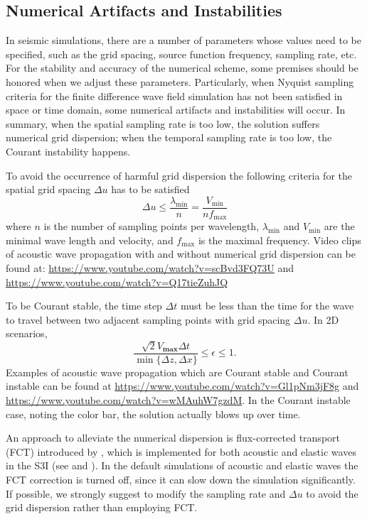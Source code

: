 \documentclass[11pt,titlepage]{article}
\theoremstyle{plain}
\theoremstyle{definition}
\theoremstyle{remark}
\numberwithin{equation}{section}
\begin{document}
\subsection{Numerical Artifacts and Instabilities}
In seismic simulations, there are a number of parameters whose values need to be specified, such as the grid spacing, source function frequency, sampling rate, etc. For the stability and accuracy of the numerical scheme, some premises should be honored when we adjust these parameters. Particularly, when Nyquist sampling criteria for the finite difference wave field simulation has not been satisfied in space or time domain, some numerical artifacts and instabilities will occur. In summary, when the spatial sampling rate is too low,  the solution suffers numerical grid dispersion; when the temporal sampling rate is too low, the Courant instability happens.

To avoid the occurrence of harmful grid dispersion the following criteria for the spatial grid spacing $\Delta u$ has to be satisfied
\begin{equation}
  \Delta u \leq \frac{\lambda_{\min}}{n} = \frac{V_{\min}}{nf_{\max}}
\end{equation}
where $n$ is the number of sampling points per wavelength, $\lambda_{\min}$ and $V_{\min}$ are the minimal wave length and velocity, and $f_{\max}$ is the maximal frequency. Video clips of acoustic wave propagation with and without numerical grid dispersion can be found at: \url{https://www.youtube.com/watch?v=scBvd3FQ73U} and \url{https://www.youtube.com/watch?v=Q17tieZuhJQ}

To be Courant stable, the time step $\Delta t$ must be less than the time for the wave to travel between two adjacent sampling points with grid spacing $\Delta u$. In 2D scenarios,
\begin{equation}
\frac{\sqrt{2}V_{\textbf{max}}\Delta t}{\min\{\Delta z, \Delta x\}}\le \epsilon \le 1.
\end{equation}
Examples of acoustic wave propagation which are Courant stable and Courant instable can be found at \url{https://www.youtube.com/watch?v=Gl1pNm3jF8g} and \url{https://www.youtube.com/watch?v=wMAuhW7gzdM}. In the Courant instable case, noting the color bar, the solution actually blows up over time.

An approach to alleviate the numerical dispersion is flux-corrected transport (FCT) introduced by \cite{Fei:1995aa}, which is implemented for both acoustic and elastic waves in the S3I (see  and ). In the default simulations of acoustic and elastic waves the FCT correction is turned off, since it can slow down the simulation significantly. If possible, we strongly suggest to modify the sampling rate and $\Delta u$ to avoid the grid dispersion rather than employing FCT.  
\end{document}

